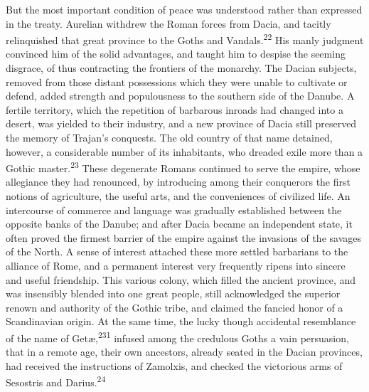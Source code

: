 But the most important condition of peace was understood rather
than expressed in the treaty. Aurelian withdrew the Roman forces
from Dacia, and tacitly relinquished that great province to the
Goths and Vandals.\textsuperscript{22} His manly judgment convinced him of the
solid advantages, and taught him to despise the seeming disgrace,
of thus contracting the frontiers of the monarchy. The Dacian
subjects, removed from those distant possessions which they were
unable to cultivate or defend, added strength and populousness to
the southern side of the Danube. A fertile territory, which the
repetition of barbarous inroads had changed into a desert, was
yielded to their industry, and a new province of Dacia still
preserved the memory of Trajan’s conquests. The old country of
that name detained, however, a considerable number of its
inhabitants, who dreaded exile more than a Gothic master.\textsuperscript{23}
These degenerate Romans continued to serve the empire, whose
allegiance they had renounced, by introducing among their
conquerors the first notions of agriculture, the useful arts, and
the conveniences of civilized life. An intercourse of commerce
and language was gradually established between the opposite banks
of the Danube; and after Dacia became an independent state, it
often proved the firmest barrier of the empire against the
invasions of the savages of the North. A sense of interest
attached these more settled barbarians to the alliance of Rome,
and a permanent interest very frequently ripens into sincere and
useful friendship. This various colony, which filled the ancient
province, and was insensibly blended into one great people, still
acknowledged the superior renown and authority of the Gothic
tribe, and claimed the fancied honor of a Scandinavian origin. At
the same time, the lucky though accidental resemblance of the
name of Getæ,\textsuperscript{231} infused among the credulous Goths a vain
persuasion, that in a remote age, their own ancestors, already
seated in the Dacian provinces, had received the instructions of
Zamolxis, and checked the victorious arms of Sesostris and
Darius.\textsuperscript{24}



